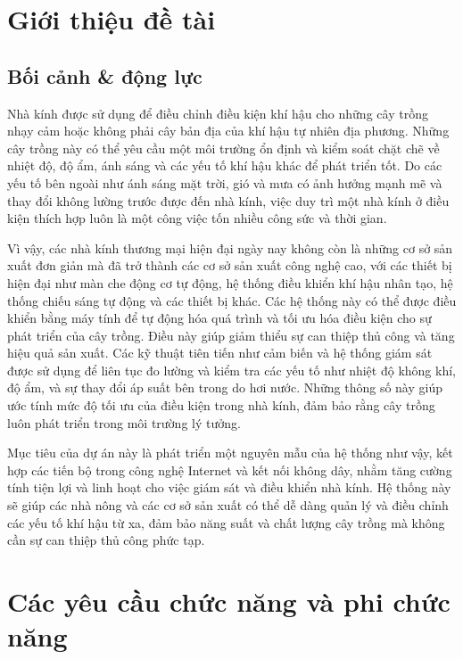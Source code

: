 \section{Giới thiệu đề tài}

\subsection{Bối cảnh \& động lực}

Nhà kính được sử dụng để điều chỉnh điều kiện khí hậu cho những cây trồng nhạy cảm hoặc không phải cây bản địa của khí hậu tự nhiên địa phương. Những cây trồng này có thể yêu cầu một môi trường ổn định và kiểm soát chặt chẽ về nhiệt độ, độ ẩm, ánh sáng và các yếu tố khí hậu khác để phát triển tốt. Do các yếu tố bên ngoài như ánh sáng mặt trời, gió và mưa có ảnh hưởng mạnh mẽ và thay đổi không lường trước được đến nhà kính, việc duy trì một nhà kính ở điều kiện thích hợp luôn là một công việc tốn nhiều công sức và thời gian.

Vì vậy, các nhà kính thương mại hiện đại ngày nay không còn là những cơ sở sản xuất đơn giản mà đã trở thành các cơ sở sản xuất công nghệ cao, với các thiết bị hiện đại như màn che động cơ tự động, hệ thống điều khiển khí hậu nhân tạo, hệ thống chiếu sáng tự động và các thiết bị khác. Các hệ thống này có thể được điều khiển bằng máy tính để tự động hóa quá trình và tối ưu hóa điều kiện cho sự phát triển của cây trồng. Điều này giúp giảm thiểu sự can thiệp thủ công và tăng hiệu quả sản xuất. Các kỹ thuật tiên tiến như cảm biến và hệ thống giám sát được sử dụng để liên tục đo lường và kiểm tra các yếu tố như nhiệt độ không khí, độ ẩm, và sự thay đổi áp suất bên trong do hơi nước. Những thông số này giúp ước tính mức độ tối ưu của điều kiện trong nhà kính, đảm bảo rằng cây trồng luôn phát triển trong môi trường lý tưởng.

Mục tiêu của dự án này là phát triển một nguyên mẫu của hệ thống như vậy, kết hợp các tiến bộ trong công nghệ Internet và kết nối không dây, nhằm tăng cường tính tiện lợi và linh hoạt cho việc giám sát và điều khiển nhà kính. Hệ thống này sẽ giúp các nhà nông và các cơ sở sản xuất có thể dễ dàng quản lý và điều chỉnh các yếu tố khí hậu từ xa, đảm bảo năng suất và chất lượng cây trồng mà không cần sự can thiệp thủ công phức tạp.

\newpage

\section{Các yêu cầu chức năng và phi chức năng}
